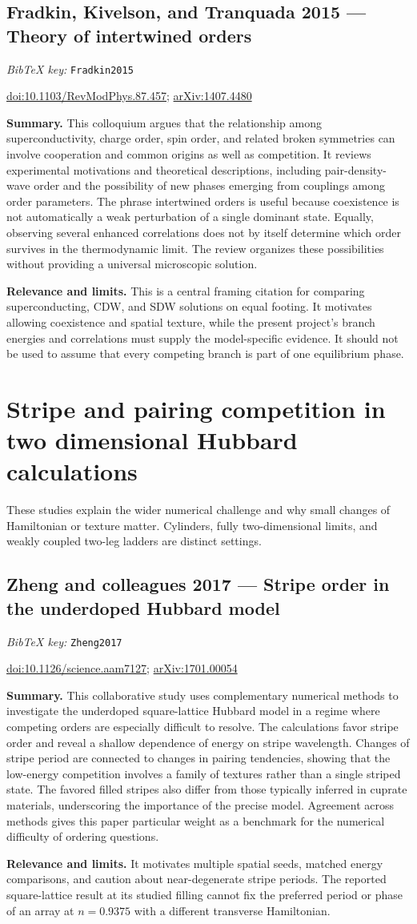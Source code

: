 \documentclass[11pt]{article}
\newcommand{\paper}[2]{\Needspace{8\baselineskip}\subsection{#2}\label{paper:#1}\textit{BibTeX key:} \texttt{#1}\quad\citep{#1}\par}
\newcommand{\doi}[1]{\href{https://doi.org/#1}{doi:#1}}
\newcommand{\arxiv}[1]{\href{https://arxiv.org/abs/#1}{arXiv:#1}}
\newcommand{\summary}{\par\textbf{Summary.} }
\newcommand{\relevance}{\par\textbf{Relevance and limits.} }
\begin{document}
\paper{Fradkin2015}{Fradkin, Kivelson, and Tranquada 2015 --- Theory of intertwined orders}
\doi{10.1103/RevModPhys.87.457}; \arxiv{1407.4480}
\summary This colloquium argues that the relationship among superconductivity, charge order, spin order, and related broken symmetries can involve cooperation and common origins as well as competition. It reviews experimental motivations and theoretical descriptions, including pair-density-wave order and the possibility of new phases emerging from couplings among order parameters. The phrase intertwined orders is useful because coexistence is not automatically a weak perturbation of a single dominant state. Equally, observing several enhanced correlations does not by itself determine which order survives in the thermodynamic limit. The review organizes these possibilities without providing a universal microscopic solution.
\relevance This is a central framing citation for comparing superconducting, CDW, and SDW solutions on equal footing. It motivates allowing coexistence and spatial texture, while the present project's branch energies and correlations must supply the model-specific evidence. It should not be used to assume that every competing branch is part of one equilibrium phase.

\section{Stripe and pairing competition in two dimensional Hubbard calculations}
These studies explain the wider numerical challenge and why small changes of Hamiltonian or texture matter. Cylinders, fully two-dimensional limits, and weakly coupled two-leg ladders are distinct settings.

\paper{Zheng2017}{Zheng and colleagues 2017 --- Stripe order in the underdoped Hubbard model}
\doi{10.1126/science.aam7127}; \arxiv{1701.00054}
\summary This collaborative study uses complementary numerical methods to investigate the underdoped square-lattice Hubbard model in a regime where competing orders are especially difficult to resolve. The calculations favor stripe order and reveal a shallow dependence of energy on stripe wavelength. Changes of stripe period are connected to changes in pairing tendencies, showing that the low-energy competition involves a family of textures rather than a single striped state. The favored filled stripes also differ from those typically inferred in cuprate materials, underscoring the importance of the precise model. Agreement across methods gives this paper particular weight as a benchmark for the numerical difficulty of ordering questions.
\relevance It motivates multiple spatial seeds, matched energy comparisons, and caution about near-degenerate stripe periods. The reported square-lattice result at its studied filling cannot fix the preferred period or phase of an array at $n=0.9375$ with a different transverse Hamiltonian.
\end{document}
